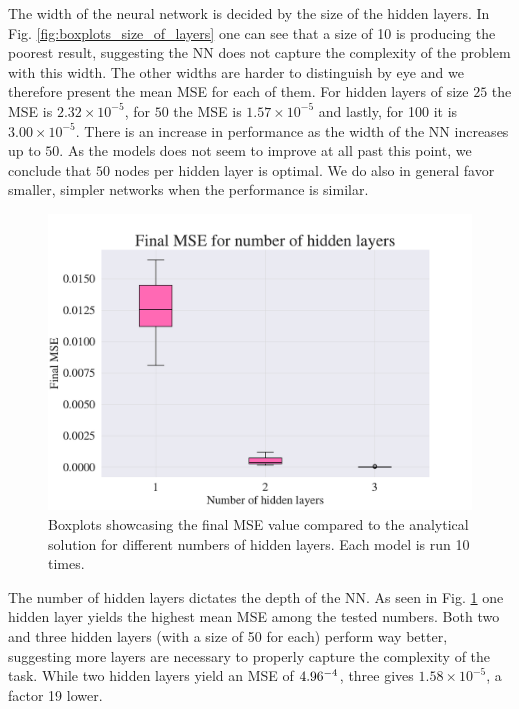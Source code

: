 The width of the neural network is decided by the size of the hidden layers.
In Fig. \ref{fig:boxplots_size_of_layers} one can see that a size of 10 is producing the poorest result, suggesting the NN does not capture the complexity of the problem with this width. 
The other widths are harder to distinguish by eye and we therefore present the mean MSE for each of them. 
For hidden layers of size $25$ the MSE is $2.32 \times 10^{-5}$, for $50$ the MSE is $1.57 \times 10^{-5}$ and lastly, for 100 it is $3.00 \times 10^{-5}$.
There is an increase in performance as the width of the NN increases up to $50$. 
As the models does not seem to improve at all past this point, we conclude that $50$ nodes per hidden layer is optimal.
We do also in general favor smaller, simpler networks when the performance is similar.

\begin{figure}[h!]
    \centering
    \includegraphics[width=1.0\linewidth]{project_3/plots/n_layers_search.pdf}
    \caption{Boxplots showcasing the final MSE value compared to the analytical solution for different numbers of hidden layers. Each model is run 10 times.}
    \label{fig:boxplots_number_of_hidden_layers}
\end{figure}


The number of hidden layers dictates the depth of the NN. 
As seen in Fig. \ref{fig:boxplots_number_of_hidden_layers} one hidden layer yields the highest mean MSE among the tested numbers. 
Both two and three hidden layers (with a size of 50 for each) perform way better, suggesting more layers are necessary to properly capture the complexity of the task. 
While two hidden layers yield an MSE of $4.96 \time 10^{-4}$, three gives $1.58 \times 10^{-5}$, a factor 19 lower. 


